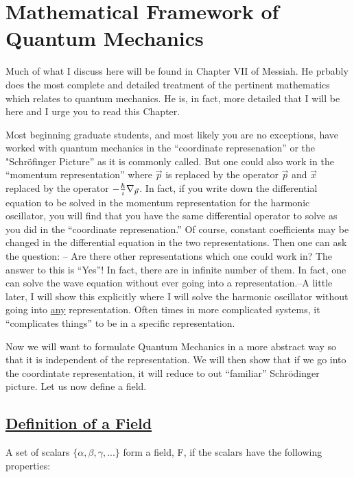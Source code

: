 \section{Mathematical Framework of Quantum Mechanics}

Much of what I discuss here will be found in Chapter VII of Messiah. He prbably does the most
complete and detailed treatment of the pertinent mathematics which relates to quantum 
mechanics. He is, in fact, more detailed that I will be here and I urge you to read this
Chapter.

Most beginning graduate students, and most likely you are no exceptions, have worked with
quantum mechanics in the ``coordinate represenation'' or the "Schr\"ofinger Picture'' as it is commonly called. But one could also work in the ``momentum representation'' where $\vec{p}$ is replaced by the operator $\vec p$ and $\vec x$ replaced by the operator 
$-{\hbar\over i}\nabla_{\vec p}$. In fact, if you write down the differential equation to be 
solved in the momentum representation for the harmonic oscillator, you will find that you have the same differential operator to solve as you did in the ``coordinate represenation.'' Of course, constant coefficients may be changed in the differential equation in the two representations. Then one can ask the question: -- Are there other representations which one could work in? The answer to this is ``Yes''! In fact, there are in infinite number of them. 
In fact, one can solve the wave equation without ever going into a representation.--A little later, I will show this explicitly where I will solve the harmonic oscillator without going into \underline{any} representation. Often times in more complicated systems, it ``complicates things'' to be in a specific representation.

Now we will want to formulate Quantum Mechanics in a more abstract way so that it is independent of the representation. 
We will then show that if we go into the coordintate representation, it will reduce to out ``familiar'' 
Schr\"odinger picture.  Let us now define a field.\\

\subsection{\underline{Definition of a Field}}

A set of scalars $\{\alpha,\beta,\gamma,...\}$ form a field, F, if the scalars have the following properties:\\

